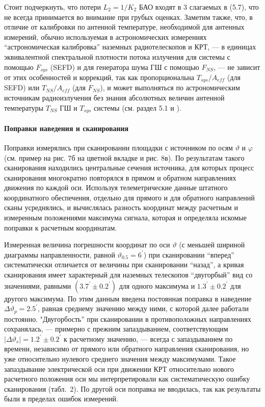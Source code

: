Стоит подчеркнуть, что потери $L_2 = 1 / K_2$ БАО входят в 3 слагаемых
в (5.7), что не всегда принимается во внимание при грубых оценках.
Заметим также, что, в отличие от калибровки по антенной температуре,
необходимой для антенных измерений, обычно
используемая в астрономических измерениях ``астрономическая калибровка'' наземных
радиотелескопов и КРТ, --- в единицах эквивалентной спектральной плотности
потока излучения для системы с помощью $F_{sys}$ (SEFD) и
для генератора шума ГШ  с помощью $F_{NS}$,   ---
не зависит от этих особенностей и
коррекций, так как пропорциональна $T_{sys}/A_{eff}$ (для SEFD) или
$T_{NS} / A_{eff}$ (для $F_{NS}$),
и может выполняться по астрономическим источникам радиоизлучения
без знания абсолютных величин антенной температуры $T_{NS}$ ГШ
и $T_{sys}$ системы (см. раздел 5.1 и \cite{}).

\paragraph{Поправки наведения и сканирования}

Поправки измерялись при сканировании площадки с источником
по осям $\vartheta$ и $\varphi$ (см. пример на рис. 7б на цветной вкладке и рис. 8в).
По результатам такого сканирования находились центральные
сечения источника, для которых процесс сканирования многократно
повторялся в прямом и обратном направлениях движения по каждой оси.
Используя телеметрические данные штатного координатного обеспечения,
отдельно для прямого и для обратного направлений сканы
усреднялись, и вычислялась разность координат между расчетным и
измеренным положениями максимума сигнала, которая и определяла
искомые поправки к расчетным координатам.

Измеренная величина погрешности координат по оси $\vartheta$ (с меньшей шириной
диаграммы направленности, равной $\vartheta_{0.5} = 6^\prime$)
при сканировании ``вперед'' систематически отличается от величины
при сканировании ``назад'', а кривая сканирования имеет характерный для наземных
телескопов ``двугорбый'' вид  со значениями, равными $(3.7^\prime \pm 0.2^\prime)$
для одного максимума и $ 1.3^\prime \pm 0.2^\prime $    для другого максимума.
По этим данным введена постоянная поправка в наведение
$\Delta \vartheta_p = 2.5^\prime$,
равная среднему значению между ними, с которой далее  работали постоянно.
"Двугорбость'' при сканировании в противоположных направлениях сохранялась,
--- примерно с прежним запаздыванием, соответствующим
$\vert \Delta \vartheta_s \vert = 1.2^\prime \pm 0.2^\prime$ к расчетному значению, ---
всегда с запаздыванием по времени, независимо от прямого или обратного
направления сканирования, но уже относительно нулевого среднего значения
между максимумами. Такое запаздывание электрической оси при движении КРТ
относительно нового расчетного положения оси мы интерпретировали как
систематическую ошибку сканирования (табл.~2).
По другой оси поправка не вводилась, так как результаты
были в пределах ошибок измерений.

